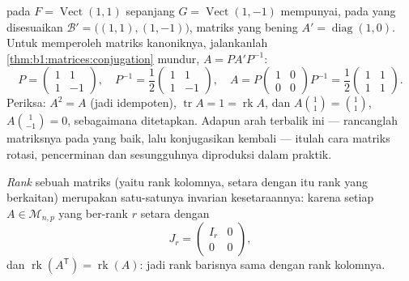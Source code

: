 \begin{example}
\label{ex:b1:matrices:reverserun}
 pada $F = \operatorname{Vect}(1,1)$ sepanjang $G =
\operatorname{Vect}(1,-1)$ mempunyai, pada  yang disesuaikan $\mathcal
B' = \bigl((1,1),(1,-1)\bigr)$, matriks yang bening $A' =
\operatorname{diag}(1, 0)$. Untuk memperoleh matriks  kanoniknya,
jalankanlah \cref{thm:b1:matrices:conjugation} mundur, $A = P A'
P^{-1}$:
\[
P = \begin{pmatrix} 1 & 1\\ 1 & -1\end{pmatrix},
\quad
P^{-1} = \frac12\begin{pmatrix} 1 & 1\\ 1 & -1\end{pmatrix},
\quad
A = P\begin{pmatrix} 1 & 0\\ 0 & 0\end{pmatrix}P^{-1}
= \frac12\begin{pmatrix} 1 & 1\\ 1 & 1\end{pmatrix}.
\]
Periksa: $A^2 = A$ (jadi idempoten), $\operatorname{tr} A = 1 =
\operatorname{rk} A$, dan $A\binom{1}{1} = \binom11$,
$A\binom{1}{-1} = 0$, sebagaimana ditetapkan. Adapun arah terbalik ini ---
rancanglah matriksnya pada  yang baik, lalu konjugasikan kembali --- itulah
cara matriks rotasi, pencerminan dan  sesungguhnya
diproduksi dalam praktik.
\end{example}

\begin{theorem}\label{thm:b1:matrices:rank}
\emph{Rank} sebuah matriks (yaitu rank kolomnya, setara dengan itu
rank  yang berkaitan) merupakan satu-satunya invarian kesetaraannya:
karena setiap $A \in \mathcal{M}_{n,p}$ yang ber-rank $r$ setara dengan
\[
J_r = \begin{pmatrix} I_r & 0 \\ 0 & 0 \end{pmatrix},
\]
dan $\operatorname{rk}(A^{\mathsf T}) = \operatorname{rk}(A)$: jadi rank barisnya
sama dengan rank kolomnya.
\end{theorem}

